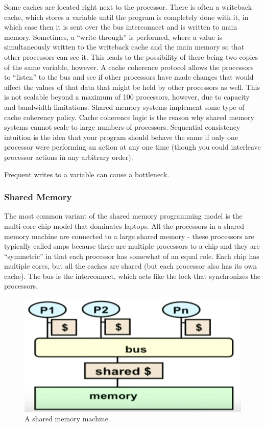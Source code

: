 \documentclass[10pt]{article}
\begin{document}
\begin{flushleft}
Some caches are located right next to the processor. There is often a writeback cache, which stores a variable until the program is completely done with it, in which case then it is sent over the bus interconnect and is written to main memory. Sometimes, a ``write-through'' is performed, where a value is simultaneously written to the writeback cache and the main memory so that other processors can see it. This leads to the possibility of there being two copies of the same variable, however. A cache coherence protocol allows the processors to ``listen'' to the bus and see if other processors have made changes that would affect the values of that data that might be held by other processors as well. This is not scalable beyond a maximum of 100 processors, however, due to capacity and bandwidth limitations. Shared memory systems implement some type of cache coherency policy. Cache coherence logic is the reason why shared memory systems cannot scale to large numbers of processors. Sequential consistency intuition is the idea that your program should behave the same if only one processor were performing an action at any one time (though you could interleave processor actions in any arbitrary order). 

Frequent writes to a variable can cause a bottleneck. 

\subsubsection{Shared Memory}

The most common variant of the shared memory programming model is the multi-core chip model that dominates laptops. All the processors in a shared memory machine are connected to a large shared memory - these processors are typically called \gls{smp}s because there are multiple processors to a chip and they are ``symmetric'' in that each processor has somewhat of an equal role. Each chip has multiple cores, but all the caches are shared (but each processor also has its own cache). The bus is the interconnect, which acts like the lock that synchronizes the processors. 

\begin{figure}[H]
\centering
\includegraphics[width=0.5\linewidth]{figures/shared-memory.pdf}
\caption{A shared memory machine.}
\end{figure}


\end{flushleft}
\end{document}
